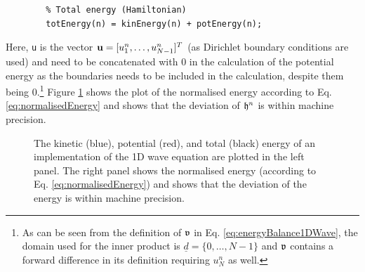 {{{{\begin{minipage}{\textwidth}
\begin{lstlisting}
        % Total energy (Hamiltonian)
        totEnergy(n) = kinEnergy(n) + potEnergy(n);
    \end{lstlisting}
\end{minipage}
Here, \texttt{u} is the vector $\mathbf{u} = [u_1^n, \hdots, u_{N-1}^n]^T$ (as Dirichlet boundary conditions are used) and need to be concatenated with $0$ in the calculation of the potential energy as the boundaries needs to be included in the calculation, despite them being 0.\footnote{As can be seen from the definition of $\mathfrak{v}$ in Eq. \eqref{eq:energyBalance1DWave}, the domain used for the inner product is $\underline{d} = \{0,\hdots, N-1\}$ and $\mathfrak{v}$ contains a forward difference in its definition requiring $u_N^n$ as well.}
    Figure \ref{fig:energy1DWave} shows the plot of the normalised energy according to Eq. \eqref{eq:normalisedEnergy} and shows that the deviation of $\mathfrak{h}^n$ is within machine precision.
    \begin{figure}[h]
        \centering
      \caption{The kinetic (blue), potential (red), and total (black) energy of an implementation of the 1D wave equation are plotted in the left panel. The right panel shows the normalised energy (according to Eq. \eqref{eq:normalisedEnergy}) and shows that the deviation of the energy is within machine precision. \label{fig:energy1DWave}}
\end{figure}

}}}}
